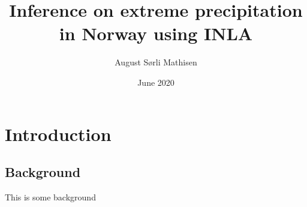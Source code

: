 \documentclass[pdftex,10pt,b5paper,twoside]{book}
\title{Inference on extreme precipitation in Norway using INLA}
\author{August Sørli Mathisen}
\date{June 2020}
\begin{document}
\maketitle

\chapter{Introduction}

\section{Background}
This is some background
\end{document}
